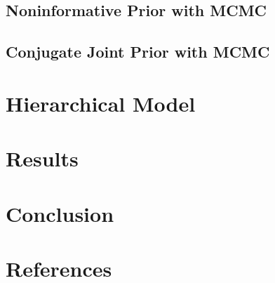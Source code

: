 \documentclass[]{article}
\begin{document}
\subsection{Noninformative Prior with
MCMC}\label{noninformative-prior-with-mcmc}

\subsection{Conjugate Joint Prior with
MCMC}\label{conjugate-joint-prior-with-mcmc}

\section{Hierarchical Model}\label{hierarchical-model}

\section{Results}\label{results}

\section{Conclusion}\label{conclusion}

\section{References}\label{references}
\end{document}
